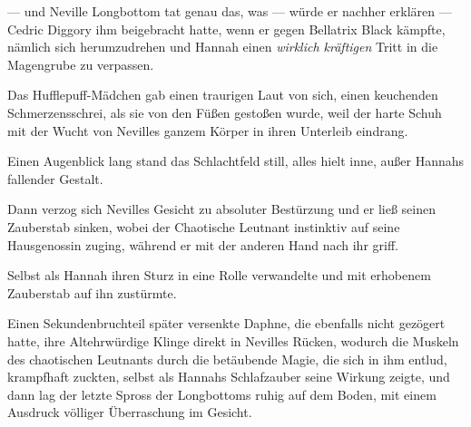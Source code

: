 — und Neville Longbottom tat genau das, was — würde er nachher erklären — Cedric Diggory ihm beigebracht hatte, wenn er gegen Bellatrix Black kämpfte, nämlich sich herumzudrehen und Hannah einen \emph{wirklich kräftigen} Tritt in die Magengrube zu verpassen.

Das Hufflepuff-Mädchen gab einen traurigen Laut von sich, einen keuchenden Schmerzensschrei, als sie von den Füßen gestoßen wurde, weil der harte Schuh mit der Wucht von Nevilles ganzem Körper in ihren Unterleib eindrang.

Einen Augenblick lang stand das Schlachtfeld still, alles hielt inne, außer Hannahs fallender Gestalt.

Dann verzog sich Nevilles Gesicht zu absoluter Bestürzung und er ließ seinen Zauberstab sinken, wobei der Chaotische Leutnant instinktiv auf seine Hausgenossin zuging, während er mit der anderen Hand nach ihr griff.

Selbst als Hannah ihren Sturz in eine Rolle verwandelte und mit erhobenem Zauberstab auf ihn zustürmte.

Einen Sekundenbruchteil später versenkte Daphne, die ebenfalls nicht gezögert hatte, ihre Altehrwürdige Klinge direkt in Nevilles Rücken, wodurch die Muskeln des chaotischen Leutnants durch die betäubende Magie, die sich in ihm entlud, krampfhaft zuckten, selbst als Hannahs Schlafzauber seine Wirkung zeigte, und dann lag der letzte Spross der Longbottoms ruhig auf dem Boden, mit einem Ausdruck völliger Überraschung im Gesicht.

